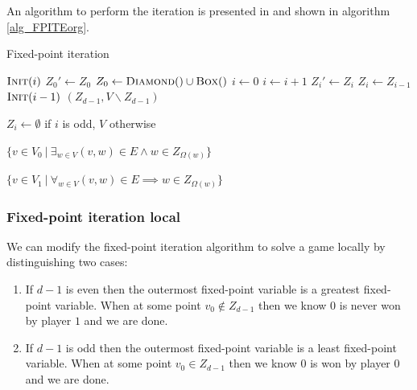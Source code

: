 An algorithm to perform the iteration is presented in \cite{FPITE} and shown in algorithm \ref{alg_FPITEorg}.
\begin{algorithm}
	\caption{Fixed-point iteration}
	\label{alg_FPITEorg}
	\begin{multicols}{2}
		\begin{algorithmic}[1]
			\State $\textsc{Init}(i)$
			\EndFor
			\Repeat
			\State $Z_0'\gets Z_0$
			\State $Z_0 \gets \textsc{Diamond}() \cup \textsc{Box}()$
			\State $i \gets 0$
			\State $i \gets i+1$
			\State $Z_i' \gets Z_i$
			\State $Z_i \gets Z_{i-1}$
			\State $\textsc{Init}(i-1)$
			\EndWhile
			\State \Return $(Z_{d-1},V\backslash Z_{d-1})$
			\EndFunction
		\end{algorithmic}\bigskip\bigskip
		\begin{algorithmic}[1]
			\Function{Init}{$i$}
			\State $Z_i \gets \emptyset$ if $i$ is odd, $V$ otherwise
			\EndFunction
		\end{algorithmic}\bigskip
		\begin{algorithmic}[1]
			\Function{Diamond}{}
			\State \Return $\{ v \in V_0\ |\ \exists_{w\in V} (v,w) \in E \wedge w \in Z_{\Omega(w)}\}$
			\EndFunction
		\end{algorithmic}\bigskip
		\begin{algorithmic}[1]
			\Function{Box}{}
			\State \Return $\{ v \in V_1\ |\ \forall_{w\in V} (v,w) \in E \implies w \in Z_{\Omega(w)}\}$
			\EndFunction
		\end{algorithmic}
	\end{multicols}
\end{algorithm}

\subsubsection{Fixed-point iteration local}
We can modify the fixed-point iteration algorithm to solve a game locally by distinguishing two cases:
\begin{enumerate}
	\item If $d-1$ is even then the outermost fixed-point variable is a greatest fixed-point variable. When at some point $v_0 \notin Z_{d-1}$ then we know $0$ is never won by player $1$ and we are done.
	\item If $d-1$ is odd then the outermost fixed-point variable is a least fixed-point variable. When at some point $v_0 \in Z_{d-1}$ then we know $0$ is won by player $0$ and we are done.
\end{enumerate}